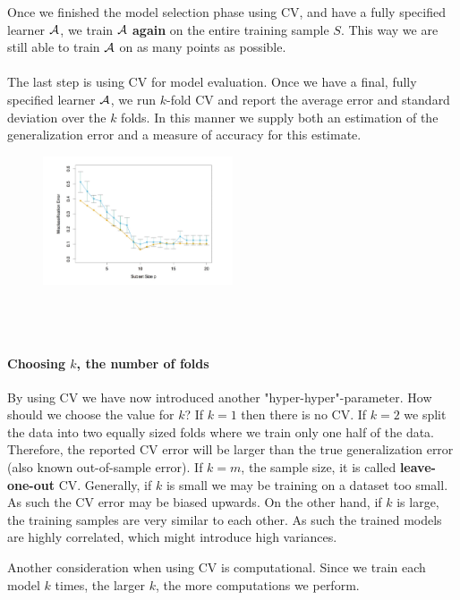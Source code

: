 Once we finished the model selection phase using CV, and have a fully specified learner $\mathcal{A}$, we train $\mathcal{A}$ \textbf{again} on the entire training sample $S$. This way we are still able to train $\mathcal{A}$ on as many points as possible.
\\~\\
The last step is using CV for model evaluation. Once we have a final, fully specified learner $\mathcal{A}$, we run $k$-fold CV and report the average error and standard deviation over the $k$ folds. In this manner we supply both an estimation of the generalization error and a measure of accuracy for this estimate.
\begin{figure}[!h]
	\centering
	\includegraphics[width=0.5\textwidth]{chapters/regularization.model.selection/figures/cv_estimator.png}
	\caption{}
\end{figure}
\\~\\
\paragraph{Choosing $k$, the number of folds} By using CV we have now introduced another "hyper-hyper"-parameter. How should we choose the value for $k$? If $k=1$ then there is no CV. If $k=2$ we split the data into two equally sized folds where we train only one half of the data. Therefore, the reported CV error will be larger than the true generalization error (also known out-of-sample error). If $k=m$, the sample size, it is called \textbf{leave-one-out} CV. Generally, if $k$ is small we may be training on a dataset too small. As such the CV error may be biased upwards. On the other hand, if $k$ is large, the training samples are very similar to each other. As such the trained models are highly correlated, which might introduce high variances.

\begin{remark}
Another consideration when using CV is computational. Since we train each model $k$ times, the larger $k$, the more computations we perform.
\end{remark}

